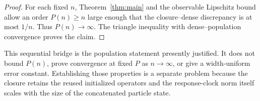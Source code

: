 \begin{proof}
For each fixed $n$, Theorem~\ref{thm:main} and the observable Lipschitz bound
allow an order $P(n)\ge n$ large enough that the closure--dense discrepancy is
at most $1/n$.  Thus $P(n)\to\infty$.  The triangle inequality with
dense--population convergence proves the claim.
\end{proof}

This sequential bridge is the population statement presently justified.  It
does not bound $P(n)$, prove convergence at fixed $P$ as $n\to\infty$, or give
a width-uniform error constant.  Establishing those properties is a separate
problem because the closure retains the reused initialized operators and the
response-clock norm itself scales with the size of the concatenated particle
state.
